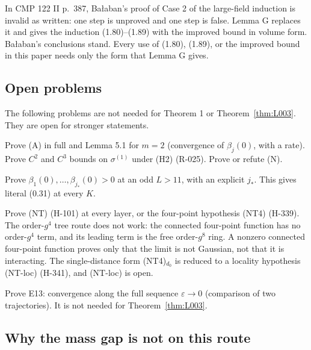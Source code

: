 \begin{remark}[CMP 122 II p.~387]\label{rem:p387}
In CMP 122 II p.~387, Ba{\l}aban's proof of Case 2 of the large-field induction is invalid as written: one step is unproved and one step is false. Lemma G replaces it and gives the induction (1.80)--(1.89) with the improved bound in volume form. Ba{\l}aban's conclusions stand. Every use of (1.80), (1.89), or the improved bound in this paper needs only the form that Lemma G gives.
\end{remark}

\subsection{Open problems}\label{sec:rem-stronger}

The following problems are not needed for Theorem 1 or Theorem~\ref{thm:L003}. They are open for stronger statements.
\begin{openproblem}
Prove (A) in full and Lemma 5.1 for $m=2$ (convergence of $\beta_j(0)$, with a rate). Prove $C^2$ and $C^3$ bounds on $\sigma^{(1)}$ under (H2) (R-025). Prove or refute (N).
\end{openproblem}
\begin{openproblem}[literal (0.31)]
Prove $\beta_1(0),\dots,\beta_{j_*}(0)>0$ at an odd $L>11$, with an explicit $j_*$. This gives literal (0.31) at every $K$.
\end{openproblem}
\begin{openproblem}[nontriviality]
Prove (NT) (H-101) at every layer, or the four-point hypothesis (NT4) (H-339). The order-$g^4$ tree route does not work: the connected four-point function has no order-$g^4$ term, and its leading term is the free order-$g^8$ ring. A nonzero connected four-point function proves only that the limit is not Gaussian, not that it is interacting. The single-distance form (NT4)$_{d_0}$ is reduced to a locality hypothesis (NT-loc) (H-341), and (NT-loc) is open.
\end{openproblem}
\begin{openproblem}[uniqueness]
Prove E13: convergence along the full sequence $\varepsilon\to0$ (comparison of two trajectories). It is not needed for Theorem~\ref{thm:L003}.
\end{openproblem}

\subsection{Why the mass gap is not on this route}\label{sec:rem-gap}

